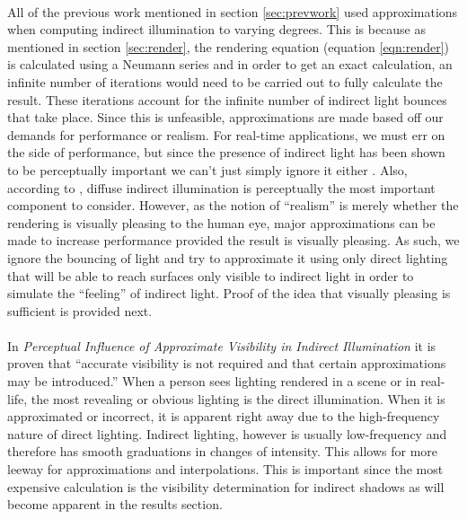 \paragraph{}
All of the previous work mentioned in section \ref{sec:prevwork} used approximations when computing indirect illumination to varying degrees.  This is because as mentioned in section \ref{sec:render}, the rendering equation (equation \ref{eqn:render}) is calculated using a Neumann series and in order to get an exact calculation, an infinite number of iterations would need to be carried out to fully calculate the result.  These iterations account for the infinite number of indirect light bounces that take place.  Since this is unfeasible, approximations are made based off our demands for performance or realism.  For real-time applications, we must err on the side of performance, but since the presence of indirect light has been shown to be perceptually important we can't just simply ignore it either \cite{Stokes2004}.  Also, according to \cite{Stokes2004}, diffuse indirect illumination is perceptually the most important component to consider.  However, as the notion of ``realism'' is merely whether the rendering is visually pleasing to the human eye, major approximations can be made to increase performance provided the result is visually pleasing.  As such, we ignore the bouncing of light and try to approximate it using only direct lighting that will be able to reach surfaces only visible to indirect light in order to simulate the ``feeling'' of indirect light.  Proof of the idea that visually pleasing is sufficient is provided next.

\paragraph{}
In \textit{Perceptual Influence of Approximate Visibility in Indirect Illumination} \cite{Yu2009} it is proven that ``accurate visibility is not required and that certain approximations may be introduced.''  When a person sees lighting rendered in a scene or in real-life, the most revealing or obvious lighting is the direct illumination.  When it is approximated or incorrect, it is apparent right away due to the high-frequency nature of direct lighting.  Indirect lighting, however is usually low-frequency and therefore has smooth graduations in changes of intensity.  This allows for more leeway for approximations and interpolations.  This is important since the most expensive calculation is the visibility determination for indirect shadows as will become apparent in the results section.  

